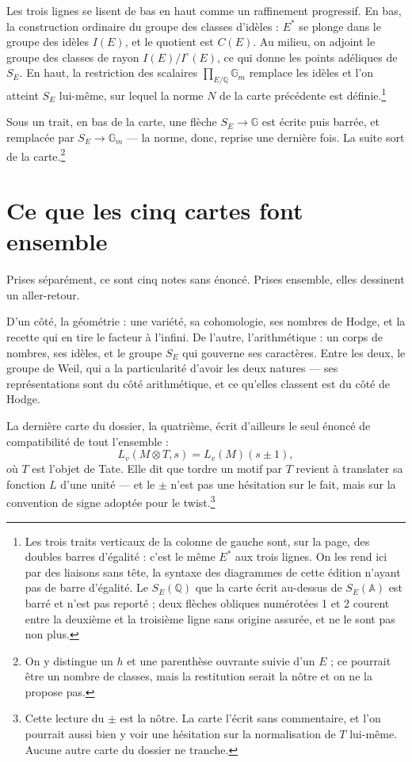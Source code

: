 \documentclass[11pt,a4paper]{article}
\begin{document}
Les trois lignes se lisent de bas en haut comme un raffinement progressif. En
bas, la construction ordinaire du groupe des classes d'idèles : $E^{*}$ se
plonge dans le groupe des idèles $I(E)$, et le quotient est $C(E)$. Au milieu,
on adjoint le groupe des classes de rayon $I(E)/I^{\circ}(E)$, ce qui donne les
points adéliques de $S_{E}$. En haut, la restriction des scalaires
$\prod_{E/\mathbb{Q}}\mathbb{G}_{m}$ remplace les idèles et l'on atteint $S_{E}$
lui-même, sur lequel la norme $N$ de la carte précédente est
définie.\footnote{Les trois traits verticaux de la colonne de gauche sont, sur
la page, des doubles barres d'égalité : c'est le même $E^{*}$ aux trois lignes.
On les rend ici par des liaisons sans tête, la syntaxe des diagrammes de cette
édition n'ayant pas de barre d'égalité. Le $S_{E}(\mathbb{Q})$ que la carte
écrit au-dessus de $S_{E}(\mathbb{A})$ est barré et n'est pas reporté ; deux
flèches obliques numérotées 1 et 2 courent entre la deuxième et la troisième
ligne sans origine assurée, et ne le sont pas non plus.}

Sous un trait, en bas de la carte, une flèche $S_{E} \to \mathbb{G}$ est écrite
puis barrée, et remplacée par $S_{E} \to \mathbb{G}_{m}$ --- la norme, donc,
reprise une dernière fois. La suite sort de la carte.\footnote{On y distingue
un $h$ et une parenthèse ouvrante suivie d'un $E$ ; ce pourrait être un nombre
de classes, mais la restitution serait la nôtre et on ne la propose pas.}

\section*{Ce que les cinq cartes font ensemble}

Prises séparément, ce sont cinq notes sans énoncé. Prises ensemble, elles
dessinent un aller-retour.

D'un côté, la géométrie : une variété, sa cohomologie, ses nombres de Hodge,
et la recette qui en tire le facteur à l'infini. De l'autre, l'arithmétique :
un corps de nombres, ses idèles, et le groupe $S_{E}$ qui gouverne ses
caractères. Entre les deux, le groupe de Weil, qui a la particularité d'avoir
les deux natures --- ses représentations sont du côté arithmétique, et ce
qu'elles classent est du côté de Hodge.

La dernière carte du dossier, la quatrième, écrit d'ailleurs le seul énoncé de
compatibilité de tout l'ensemble :
\[
L_{v}(M \otimes T, s) = L_{v}(M)(s \pm 1),
\]
où $T$ est l'objet de Tate. Elle dit que tordre un motif par $T$ revient à
translater sa fonction $L$ d'une unité --- et le $\pm$ n'est pas une hésitation
sur le fait, mais sur la convention de signe adoptée pour le
twist.\footnote{Cette lecture du $\pm$ est la nôtre. La carte l'écrit sans
commentaire, et l'on pourrait aussi bien y voir une hésitation sur la
normalisation de $T$ lui-même. Aucune autre carte du dossier ne tranche.}
\end{document}
